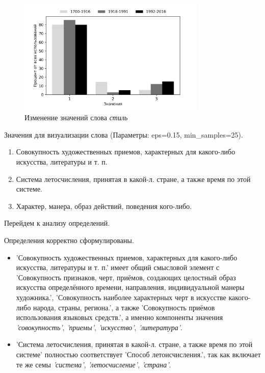 \begin{figure}[H]
	\centering
	\includegraphics[width=0.8\textwidth]{img/visualizations/stil'_minimal}
	\caption{Изменение значений слова \textit{стиль}}
	\label{fig:Стиль_книга}
\end{figure}

Значения для визуализации слова  (Параметры: eps=0.15, min\_samples=25).

\begin{enumerate}
    \item Совокупность художественных приемов, характерных для какого-либо искусства, литературы и т. п.
    \item Система летосчисления, принятая в какой-л. стране, а также время по этой системе.
    \item Характер, манера, образ действий, поведения кого-либо.
\end{enumerate}

Перейдем к анализу определений.

Определения корректно сформулированы.

\begin{itemize}
    \item ’Совокупность художественных приемов, характерных для какого-либо искусства, литературы и т. п.’ имеет общий смысловой элемент с
’Совокупность признаков, черт, приёмов, создающих целостный образ искусства определённого времени, направления, индивидуальной манеры художника.’,
’Совокупность наиболее характерных черт в искусстве какого-либо народа, страны, региона.’, а также
’Совокупность приёмов использования языковых средств.’,
а именно компоненты значения \textit{’совокупность’}, \textit{’приемы’}, \textit{’искусство’}, \textit{’литература’}.

    \item ’Система летосчисления, принятая в какой-л. стране, а также время по этой системе’ полностью соответствует
’Способ летоисчисления.’, так как включает те же семы \textit{’система’}, \textit{’летосчисление’}, \textit{’страна’}.
\end{itemize}

